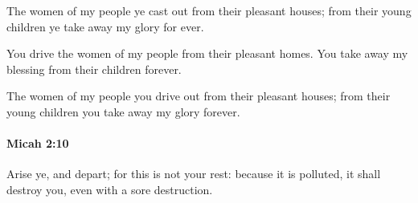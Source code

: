 			\begin{versebox}
					\item[BHS] 
					\item[LXX] 
					\item[ASV] The women of my people ye cast out from their pleasant houses; from their young children ye take away my glory for ever.
					\item[NIV] You drive the women of my people from their pleasant homes. You take away my blessing from their children forever.
					\item[NRSV] The women of my people you drive out from their pleasant houses; from their young children you take away my glory forever.
			\end{versebox}

		\paragraph{Micah 2:10} %
			\label{MICAH-2-10}

			Arise ye, and depart; for this is not your rest: because it is polluted, it shall destroy you, even with a sore destruction.

